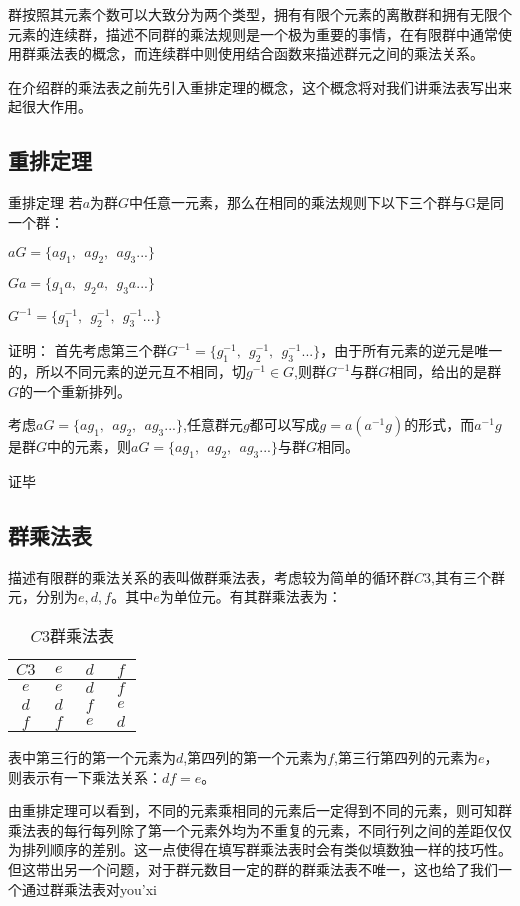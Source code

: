 

群按照其元素个数可以大致分为两个类型，拥有有限个元素的离散群和拥有无限个元素的连续群，描述不同群的乘法规则是一个极为重要的事情，在有限群中通常使用群乘法表的概念，而连续群中则使用结合函数来描述群元之间的乘法关系。

在介绍群的乘法表之前先引入重排定理的概念，这个概念将对我们讲乘法表写出来起很大作用。

\subsection{重排定理}

\begin{theorem}{重排定理}
若$a$为群$G$中任意一元素，那么在相同的乘法规则下以下三个群与G是同一个群：

$aG=\{ag_1,~~ag_2,~~ag_3...\}$

$Ga=\{g_1a,~~g_2a,~~g_3a...\}$

$G^{-1}=\{g_1^{-1},~~g_2^{-1},~~g_3^{-1}...\}$
\end{theorem}

证明：
首先考虑第三个群$G^{-1}=\{g_1^{-1},~~g_2^{-1},~~g_3^{-1}...\}$，由于所有元素的逆元是唯一的，所以不同元素的逆元互不相同，切$g^{-1}\in G$,则群$G^{-1}$与群$G$相同，给出的是群$G$的一个重新排列。

考虑$aG=\{ag_1,~~ag_2,~~ag_3...\}$,任意群元$g$都可以写成$g=a(a^{-1}g)$的形式，而$a^{-1}g$是群$G$中的元素，则$aG=\{ag_1,~~ag_2,~~ag_3...\}$与群$G$相同。

证毕

\subsection{群乘法表}

描述有限群的乘法关系的表叫做群乘法表，考虑较为简单的循环群$C3$,其有三个群元，分别为$e,d,f$。其中$e$为单位元。有其群乘法表为：

\begin{table}[ht]
\centering
\caption{$C3$群乘法表}\label{groupt_tab1}
\begin{tabular}{|c|c|c|c|}
\hline
$C3$ & $~e~$ & $~d~$ & $~f~$ \\
\hline
$e$ & $e$ & $d$ & $f$ \\
\hline
$d$ & $d$ & $f$ & $e$ \\
\hline
$f$ & $f$ & $e$ & $d$ \\
\hline
\end{tabular}
\end{table}

表中第三行的第一个元素为$d$,第四列的第一个元素为$f$,第三行第四列的元素为$e$，则表示有一下乘法关系：$df=e$。

由重排定理可以看到，不同的元素乘相同的元素后一定得到不同的元素，则可知群乘法表的每行每列除了第一个元素外均为不重复的元素，不同行列之间的差距仅仅为排列顺序的差别。这一点使得在填写群乘法表时会有类似填数独一样的技巧性。但这带出另一个问题，对于群元数目一定的群的群乘法表不唯一，这也给了我们一个通过群乘法表对you'xi